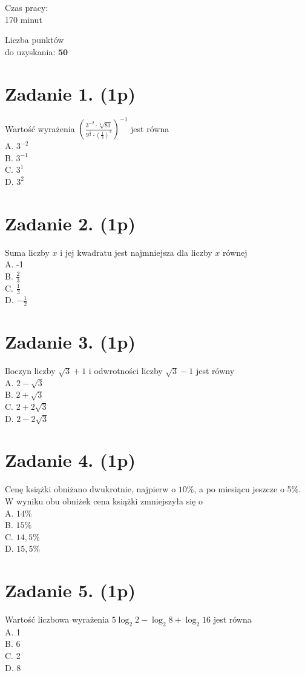 \documentclass[10pt]{article}
\begin{document}
Czas pracy:\\
170 minut

Liczba punktów\\
do uzyskania: \(\mathbf{5 0}\)

\section*{Zadanie 1. (1p)}
Wartość wyrażenia \(\left(\frac{3^{-2} \cdot \sqrt[4]{81}}{9^{\frac{1}{2}} \cdot\left(\frac{1}{3}\right)^{3}}\right)^{-1}\) jest równa\\
A. \(3^{-2}\)\\
B. \(3^{-1}\)\\
C. \(3^{1}\)\\
D. \(3^{2}\)

\section*{Zadanie 2. (1p)}
Suma liczby \(x\) i jej kwadratu jest najmniejsza dla liczby \(x\) równej\\
A. -1\\
B. \(\frac{2}{3}\)\\
C. \(\frac{1}{3}\)\\
D. \(-\frac{1}{2}\)

\section*{Zadanie 3. (1p)}
Iloczyn liczby \(\sqrt{3}+1\) i odwrotności liczby \(\sqrt{3}-1\) jest równy\\
A. \(2-\sqrt{3}\)\\
B. \(2+\sqrt{3}\)\\
C. \(2+2 \sqrt{3}\)\\
D. \(2-2 \sqrt{3}\)

\section*{Zadanie 4. (1p)}
Cenę książki obniżano dwukrotnie, najpierw o \(10 \%\), a po miesiącu jeszcze o 5\%. W wyniku obu obniżek cena książki zmniejszyła się o\\
A. \(14 \%\)\\
B. \(15 \%\)\\
C. \(14,5 \%\)\\
D. \(15,5 \%\)

\section*{Zadanie 5. (1p)}
Wartość liczbowa wyrażenia \(5 \log _{2} 2-\log _{2} 8+\log _{2} 16\) jest równa\\
A. 1\\
B. 6\\
C. 2\\
D. 8
\end{document}
